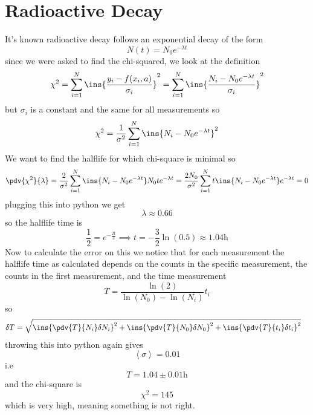 \clearpage
\section{Radioactive Decay}
It's known radioactive decay follows an exponential decay of the form 
\begin{equation}
    N(t) = N_0 e^{-\lambda t}
\end{equation}
since we were asked to find the chi-squared, we look at the definition 
\begin{equation}
    \chi^2 = \sum_{i=1}^{N}\ins{\frac{y_i-f(x_i,a)}{\sigma_i}}^2 = \sum_{i=1}^{N}\ins{\frac{N_i-N_0 e^{-\lambda t}}{\sigma_i}}^2
\end{equation}
but \(\sigma_i\) is a constant and the same for all measurements so
\begin{equation}
    \chi^2 = \frac{1}{\sigma^2}\sum_{i=1}^{N}\ins{N_i-N_0 e^{-\lambda t}}^2
\end{equation}
We want to find the halflife for which chi-square is minimal so
\begin{equation}
    \pdv{\chi^2}{\lambda} = \frac{2}{\sigma^2}\sum_{i=1}^{N}\ins{N_i-N_0e^{-\lambda t}}N_0te^{-\lambda t} = \frac{2 N_0}{\sigma^2}\sum_{i=1}^{N}t\ins{N_i-N_0e^{-\lambda t}}e^{-\lambda t}=0
\end{equation}
plugging this into python we get 
\begin{equation}
    \lambda \approx 0.66
\end{equation}
so the halflife time is 
\begin{equation}
    \frac{1}{2}=e^{-\frac{2t}{3}} \implies t = -\frac{3}{2}\ln(0.5) \approx 1.04 \unit{\hour}
\end{equation}
Now to calculate the error on this we notice that for each measurement the halflife time as calculated depends on the counts in the specific measurement, the counts in the first measurement, and the time measurement
\begin{equation}
    T = \frac{\ln(2)}{\ln(N_0)-\ln(N_i)}t_i
\end{equation}
so 
\begin{align}
    \delta T &= \sqrt{\ins{\pdv{T}{N_i}\delta N_i}^2+\ins{\pdv{T}{N_0}\delta N_0}^2+\ins{\pdv{T}{t_i}\delta t_i}^2}
\end{align}
throwing this into python again gives 
\begin{equation}
    \left<\sigma\right> = 0.01
\end{equation}
i.e 
\begin{equation}
    T = 1.04\pm0.01\unit{\hour}
\end{equation}
and the chi-square is 
\begin{equation}
    \chi^2 = 145
\end{equation}
which is very high, meaning something is not right.